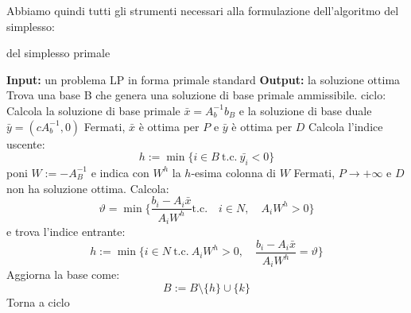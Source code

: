 \documentclass[a4paper,11pt]{article}
\begin{document}
Abbiamo quindi tutti gli strumenti necessari alla formulazione dell'algoritmo del simplesso:
\begin{algorithm}[H]
\caption{del simplesso primale}
\begin{algorithmic}
	\STATE \textbf{Input:} un problema LP in forma primale standard
	\STATE \textbf{Output:} la soluzione ottima 
	\STATE Trova una base B che genera una soluzione di base primale ammissibile.
	\STATE \textsf{ciclo:}
	\STATE Calcola la soluzione di base primale $\bar{x} = A_b^{-1} b_B$ e la soluzione di base duale $\bar{y} = (cA_b^{-1}, 0)$
		\STATE Fermati, $\bar{x}$ è ottima per $P$ e $\bar{y}$ è ottima per $D$
	\ELSE
		\STATE Calcola l'indice uscente: 
		$$
		h := \min\{ i \in B \ \text{t.c.} \ \bar{y_i} < 0 \}
		$$
		poni $W := -A_B^{-1}$ e indica con $W^h$ la $h$-esima colonna di $W$
	\ENDIF
		\STATE Fermati, $P \rightarrow +\infty$ e $D$ non ha soluzione ottima.
	\ELSE
		\STATE Calcola:
		$$
		\vartheta = \min\{ \frac{b_i - A_i \bar{x}}{A_i W^h} \text{t.c.} \quad i \in N, \quad A_i W^h > 0 \}
		$$
		e trova l'indice entrante: 
		$$ 
		h := \min\{ i \in N \ \text{t.c.} \ A_i W^h > 0, \quad \frac{b_i - A_i \bar{x}}{A_i W^h} = \vartheta \} 
		$$
	\ENDIF
	\STATE Aggiorna la base come:
	$$
	B := B \setminus \{h\} \cup \{k\}
	$$
	\STATE Torna a \textsf{ciclo}
\end{algorithmic}
\end{algorithm}
\end{document}
